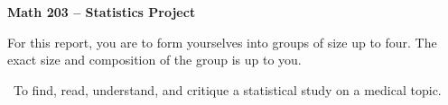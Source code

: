 
\textheight 8.5in
\voffset=-0.7in

\pagestyle{empty}

\begin{center}
\Large\bf
Math 203 -- Statistics Project
\end{center}

\vspace{0.25in}

For this report, you are to form yourselves into groups of size up to
four.  The exact size and composition of the group is up to you.

\vspace{0.2in}

\par{}\ To find, read, understand, and critique a
statistical study on a medical topic.

\vspace{0.2in}

